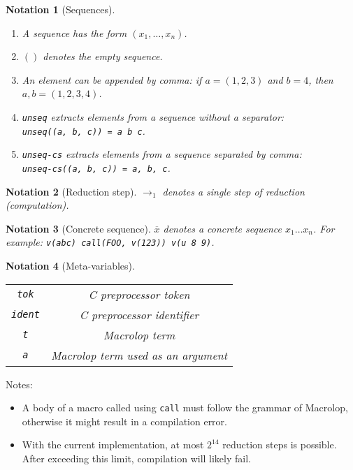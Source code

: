 \documentclass[12pt]{article}
\theoremstyle{break}
\newtheorem{notation}{Notation}
\begin{document}
\label{SequencesNotation}
\begin{notation}[Sequences]
    \begin{enumerate}
        \item A sequence has the form $(x_1, \ldots, x_n)$.
        \item $()$ denotes the empty sequence.
        \item An element can be appended by comma: if $a = (1, 2, 3)$ and $b = 4$, then $a, b = (1, 2, 3, 4)$.
        \item \texttt{unseq} extracts elements from a sequence without a separator: \\
        \texttt{unseq((a, b, c)) = a b c}.
        \item \texttt{unseq-cs} extracts elements from a sequence separated by comma: \\
        \texttt{unseq-cs((a, b, c)) = a, b, c}.
    \end{enumerate}
\end{notation}

\begin{notation}[Reduction step]
    $\to_1$ denotes a single step of reduction (computation).
\end{notation}

\begin{notation}[Concrete sequence]
    $\overline{x}$ denotes a concrete sequence $x_1 \ldots x_n$. For example:
    \texttt{v(abc) call(FOO, v(123)) v(u 8 9)}.
\end{notation}

\begin{notation}[Meta-variables]
    \ \\
    \begin{tabular}{|c|c|}
        \hline
        \texttt{tok} & C preprocessor token \\
        \texttt{ident} & C preprocessor identifier \\
        \texttt{t} & Macrolop term \\
        \texttt{a} & Macrolop term used as an argument \\
        \hline
    \end{tabular}
\end{notation}

Notes:

\begin{itemize}
    \item A body of a macro called using \texttt{call} must follow the grammar of
    Macrolop, otherwise it might result in a compilation error.
    \item With the current implementation, at most $2^{14}$ reduction steps is
    possible. After exceeding this limit, compilation will likely fail.
\end{itemize}

\printbibliography
\end{document}
